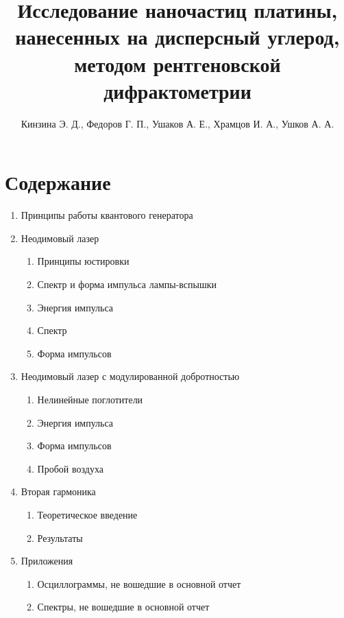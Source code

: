 \documentclass[twocolumn]{article}
\title{Исследование наночастиц платины, нанесенных на дисперсный углерод, методом рентгеновской дифрактометрии}
\author{Кинзина Э. Д., Федоров Г. П., Ушаков А. Е., Храмцов И. А., Ушков А. А.}
\begin{document}
        
            \maketitle
       

    
\section*{Содержание}
\begin{enumerate}
\def\labelenumi{\arabic{enumi}.}
\item
  Принципы работы квантового генератора
\item
  Неодимовый лазер
    \begin{enumerate}[{2.}1]

	\item
  Принципы юстировки
	\item
  Спектр и форма импульса лампы-вспышки
	\item
  Энергия импульса
	\item
  Спектр
	\item
  Форма импульсов
  \end{enumerate}
\item
  Неодимовый лазер с модулированной добротностью
    \begin{enumerate}[{3.}1]

	\item
  Нелинейные поглотители
	\item
  Энергия импульса
	\item
  Форма импульсов
	\item
  Пробой воздуха
  \end{enumerate}
\item
  Вторая гармоника
    \begin{enumerate}[{4.}1]

	\item
  Теоретическое введение
	\item
  Результаты
  \end{enumerate}
\item
  Приложения
    \begin{enumerate}[{5.}1]

	\item
  Осциллограммы, не вошедшие в основной отчет
  
	\item
  Спектры, не вошедшие в основной отчет
  \end{enumerate}
\end{enumerate}
\end{document}
